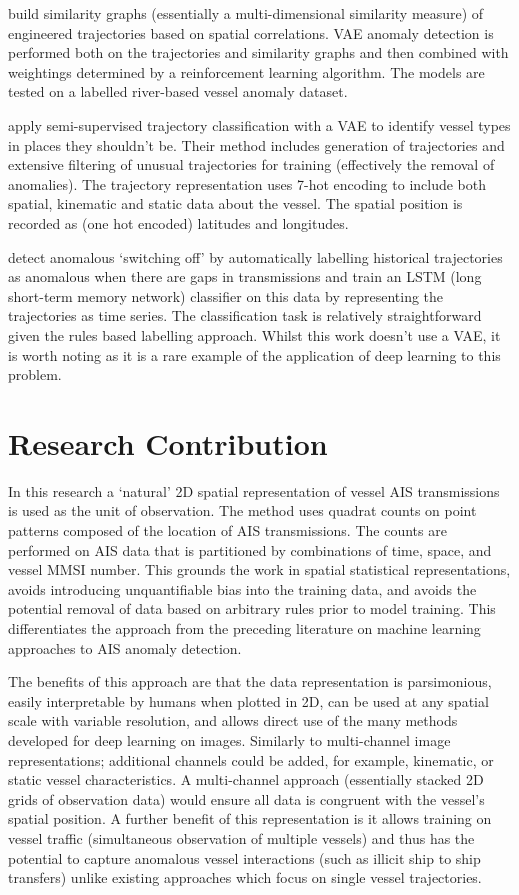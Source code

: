 \documentclass{mldsmsc}
\begin{document}
\cite{hu_intelligent_2023} build similarity graphs (essentially a multi-dimensional similarity measure) of engineered trajectories based on spatial correlations. VAE anomaly detection is performed both on the trajectories and similarity graphs and then combined with weightings determined by a reinforcement learning algorithm. The models are tested on a labelled river-based vessel anomaly dataset.

\cite{duan_semi-supervised_2022} apply semi-supervised trajectory classification with a VAE to identify vessel types in places they shouldn't be. Their method includes generation of trajectories and extensive filtering of unusual trajectories for training (effectively the removal of anomalies). The trajectory representation uses 7-hot encoding to include both spatial, kinematic and static data about the vessel. The spatial position is recorded as (one hot encoded) latitudes and longitudes.

\cite{singh_machine_2020} detect anomalous ‘switching off’ by automatically labelling historical trajectories as anomalous when there are gaps in transmissions and train an LSTM (long short-term memory network) classifier on this data by representing the trajectories as time series. The classification task is relatively straightforward given the rules based labelling approach. Whilst this work doesn't use a VAE, it is worth noting as it is a rare example of the application of deep learning to this problem. 

\section{Research Contribution}

In this research a `natural' 2D spatial representation of vessel AIS transmissions is used as the unit of observation. The method uses quadrat counts on point patterns composed of the location of AIS transmissions. The counts are performed on AIS data that is partitioned by combinations of time, space, and vessel MMSI number. This grounds the work in spatial statistical representations, avoids introducing unquantifiable bias into the training data, and avoids the potential removal of data based on arbitrary rules prior to model training. This differentiates the approach from the preceding literature on machine learning approaches to AIS anomaly detection. 

The benefits of this approach are that the data representation is parsimonious, easily interpretable by humans when plotted in 2D, can be used at any spatial scale with variable resolution, and allows direct use of the many methods developed for deep learning on images. Similarly to multi-channel image representations; additional channels could be added, for example, kinematic, or static vessel characteristics. A multi-channel approach (essentially stacked 2D grids of observation data) would ensure all data is congruent with the vessel’s spatial position. A further benefit of this representation is it allows training on vessel traffic (simultaneous observation of multiple vessels) and thus has the potential to capture anomalous vessel interactions (such as illicit ship to ship transfers) unlike existing approaches which focus on single vessel trajectories.
\end{document}
